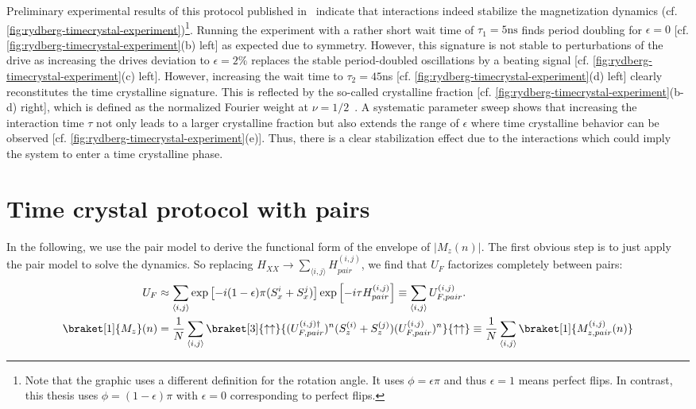 Preliminary experimental results of this protocol published in~\cite{geierShapingHamiltonianManybody} indicate that interactions indeed stabilize the magnetization dynamics (cf. \autoref{fig:rydberg-timecrystal-experiment})\footnote{Note that the graphic uses a different definition for the rotation angle. It uses $\phi=\epsilon \pi$ and thus $\epsilon = 1$ means perfect flips. In contrast, this thesis uses $\phi=(1-\epsilon)\pi$ with $\epsilon=0$ corresponding to perfect flips.}. Running the experiment with a rather short wait time of $\tau_1=5\mathrm{ns}$ finds period doubling for $\epsilon=0$ [cf. \autoref{fig:rydberg-timecrystal-experiment}(b) left] as expected due to symmetry. However, this signature is not stable to perturbations of the drive as increasing the drives deviation to $\epsilon=2\%$ replaces the stable period-doubled oscillations by a beating signal [cf. \autoref{fig:rydberg-timecrystal-experiment}(c) left]. 
However, increasing the wait time to $\tau_2=45$ns [cf. \autoref{fig:rydberg-timecrystal-experiment}(d) left] clearly reconstitutes the time crystalline signature. This is reflected by the so-called crystalline fraction [cf. \autoref{fig:rydberg-timecrystal-experiment}(b-d) right], which is defined as the normalized Fourier weight at $\nu=1/2$~\cite{choiObservationDiscreteTimecrystalline2017}. A systematic parameter sweep shows that increasing the interaction time $\tau$ not only leads to a larger crystalline fraction but also extends the range of $\epsilon$ where time crystalline behavior can be observed [cf. \autoref{fig:rydberg-timecrystal-experiment}(e)]. Thus, there is a clear stabilization effect due to the interactions which could imply the system to enter a time crystalline phase.


\section{Time crystal protocol with pairs}

In the following, we use the pair model to derive the functional form of the envelope of $|M_z(n)|$. The first obvious step is to just apply the pair model to solve the dynamics. So replacing $H_{XX}\rightarrow \sum_{\langle i,j\rangle}H_{pair}^{(i,j)}$, we find that $U_{F}$ factorizes completely between pairs:
\begin{align}
	U_F &\approx \sum_{\langle i,j\rangle} \exp\left[-i(1-\epsilon)\pi (S_x^i+S_x^j)\right] \exp\left[-i\tau H_{pair}^{(i,j)} \right] \equiv \sum_{\langle i,j\rangle} U_{F,pair}^{(i,j)}.\\
	\braket[1]{M_z}(n) &= \frac{1}{N}\sum_{\langle i,j\rangle} \braket[3]{\uparrow\uparrow}{(U_{F,pair}^{(i,j)\dagger})^n (S_z^{(i)}+S_z^{(j)})(U_{F,pair}^{(i,j)})^n}{\uparrow\uparrow} \equiv \frac{1}{N}\sum_{\langle i,j\rangle} \braket[1]{M^{(i,j)}_{z,pair}(n)}
\end{align}

